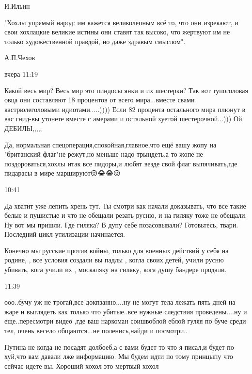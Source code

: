 И.Ильин


"Хохлы упрямый народ: им кажется великолепным всё то, что они изрекают, и свои
хохлацкие великие истины они ставят так высоко, что жертвуют им не только
художественной правдой, но даже здравым смыслом".

А.П.Чехов

вчера 11:19

Какой весь мир? Весь мир это пиндосы янки и их шестерки? Так вот тупоголовая
овца они составляют 18 процентов от всего мира...вместе свами кастрюлеголовыми
идиотами.....)))) Если 82 процента остального мира плюнут в вас гнид-вы утонете
вместе с амерами и остальной хуетой шестерочной...))) Ой ДЕБИЛЫ,,,,,


Да, нормальная спецоперация,спокойная,главное,что ещё вашу жопу на "британский
флаг"не режут,но меньше надо трындеть,а то жопе не поздороваться,хохлы итак все
пидоры,и любят везде свой флаг выпячивать,где пидарасы в мире маршируют😜😂😂😜

10:41

Да хватит уже лепить хрень тут. Ты смотри как начали доказывать, что все такие
белые и пушистые и что не обещали резать русню, и на гиляку тоже не обещали. Ну
вот мы пришли. Где гиляка? В дупу себе позасовывали? Готовьтесь, твари.
Последний цикл утилизации начинается.


Конечно мы русские против войны, только для военных действий у себя на родине,
, все условия создали вы падлы , когла своих детей, учили русню убивать, кога
учили их , москаляку на гиляку, кога душу бандере продали.

11:39

ооо..бучу уж не трогай,все докпзанно....ну не могут тела лежать пять дней на
жаре и выглядеть как только что убитые..все нужные следствия проведены....ну и
еще..пересмотри видео ,где ваш наркоман соишвоблой еблой гуляя по буче среди
тел, очень весело общаются...не поленись,найди и посмотри..


Путина не когда не посадят долбоеб,а с вами будет то что я писал,и будет по
хуй,что вам давали лже информацию. Мы будем идти по тому принцыпу что сейчас
идете вы. Хороший хохол это мертвый хохол

